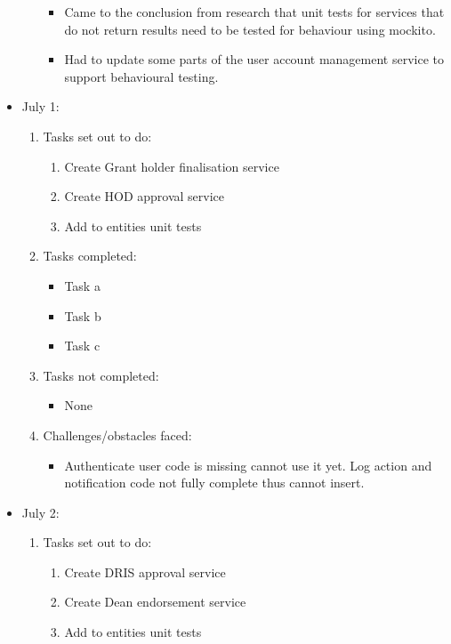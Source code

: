 \documentclass[12pt]{article}
\begin{document}
\begin{itemize}
\begin{enumerate}
		\begin{itemize}
			\item Came to the conclusion from research that unit tests for services that do not return results need to be tested for behaviour using mockito.
			\item Had to update some parts of the user account management service to support behavioural testing.
		\end{itemize}			
	\end{enumerate}
	\item July 1:
	\begin{enumerate}
		\item Tasks set out to do:
		\begin{enumerate}
			\item Create Grant holder finalisation service
			\item Create HOD approval service
			\item Add to entities unit tests			
		\end{enumerate}
		\item Tasks completed:
		\begin{itemize}
			\item Task a
			\item Task b
			\item Task c								
		\end{itemize}
		\item Tasks not completed:
		\begin{itemize}
			\item None
		\end{itemize}
		\item Challenges/obstacles faced:
		\begin{itemize}
			\item Authenticate user code is missing cannot use it yet. Log action and notification code not fully complete thus cannot insert.
		\end{itemize}			
	\end{enumerate}
	\item July 2:
	\begin{enumerate}
		\item Tasks set out to do:
		\begin{enumerate}
			\item Create DRIS approval service
			\item Create Dean endorsement service
			\item Add to entities unit tests			
		\end{enumerate}

\end{enumerate}
\end{itemize}
\end{document}
